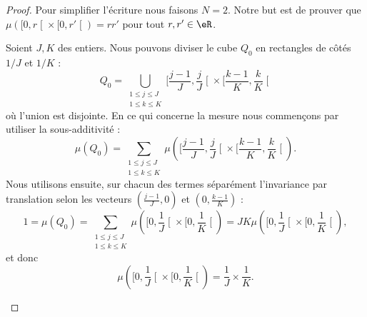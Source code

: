 \begin{proof}
	Pour simplifier l'écriture nous faisons \( N=2\). Notre but est de prouver que \( \mu(  \mathopen[ 0 , r \mathclose[\times \mathopen[ 0 , r' \mathclose[ )=rr'\) pour tout \( r,r'\in \eR\).

	\begin{subproof}
		\spitem[Longueur =\( 1/J\)]
		Soient \( J,K\) des entiers. Nous pouvons diviser le cube \( Q_0\) en rectangles de côtés \( 1/J\) et \( 1/K\) :
		\begin{equation}
			Q_0=\bigcup_{\substack{1\leq j\leq J\\1\leq k\leq K}}\mathopen[ \frac{ j-1 }{ J } , \frac{ j }{ J } \mathclose[\times \mathopen[ \frac{ k-1 }{ K } , \frac{ k }{ K } \mathclose[
		\end{equation}
		où l'union est disjointe. En ce qui concerne la mesure nous commençons par utiliser la sous-additivité :
		\begin{equation}
			\mu(Q_0)=\sum_{\substack{1\leq j\leq J\\1\leq k\leq K}}\mu\left(  \mathopen[ \frac{ j-1 }{ J } , \frac{ j }{ J } \mathclose[\times \mathopen[ \frac{ k-1 }{ K } , \frac{ k }{ K } \mathclose[      \right).
		\end{equation}
		Nous utilisons ensuite, sur chacun des termes séparément l'invariance par translation selon les vecteurs \( (\frac{ j-1 }{ J },0)\) et \( ( 0,\frac{ k-1 }{ K } )\) :
		\begin{equation}
			1=\mu(Q_0)=\sum_{\substack{1\leq j\leq J\\1\leq k\leq K}}\mu\left(  \mathopen[ 0,\frac{1}{ J } \mathclose[\times \mathopen[0,\frac{1}{ K }\mathclose[      \right)=JK\mu\left(  \mathopen[ 0,\frac{1}{ J } \mathclose[\times \mathopen[0,\frac{1}{ K }\mathclose[      \right),
		\end{equation}
		et donc
		\begin{equation}
			\mu\left(  \mathopen[ 0,\frac{1}{ J } \mathclose[\times \mathopen[0,\frac{1}{ K }\mathclose[      \right)=\frac{1}{ J }\times \frac{1}{ K }.
		\end{equation}
		\spitem[Longueur \( L/K\)]


\end{subproof}
\end{proof}
